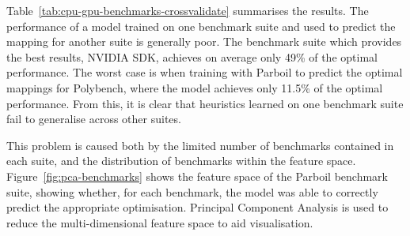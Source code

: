 Table~\ref{tab:cpu-gpu-benchmarks-crossvalidate} summarises the results. The performance of a model trained on one benchmark suite and used to predict the mapping for another suite is generally poor. The benchmark suite which provides the best results, NVIDIA SDK, achieves on average only 49\% of the optimal performance. The worst case is when training with Parboil to predict the optimal mappings for Polybench, where the model achieves only 11.5\% of the optimal performance. From this, it is clear that heuristics learned on one benchmark suite fail to generalise across other suites.

\begin{table}
	\centering
	
  \caption[Cross-validation of benchmark suites on a predictive model]{%
    Performance relative to the optimal of the \citeauthor{Grewe2013} predictive model across different benchmark suites on an AMD GPU. The columns show the suite used for training; the rows show the suite used for testing. On average, a predictive model trained on one benchmark suite and tested on another achieves only 49\% of the optimal performance.%
  }
  \label{tab:cpu-gpu-benchmarks-crossvalidate}
\end{table}

\newpage
This problem is caused both by the limited number of benchmarks contained in each suite, and the distribution of benchmarks within the feature space. Figure~\ref{fig:pca-benchmarks} shows the feature space of the Parboil benchmark suite, showing whether, for each benchmark, the model was able to correctly predict the appropriate optimisation. Principal Component Analysis is used to reduce the multi-dimensional feature space to aid visualisation.

